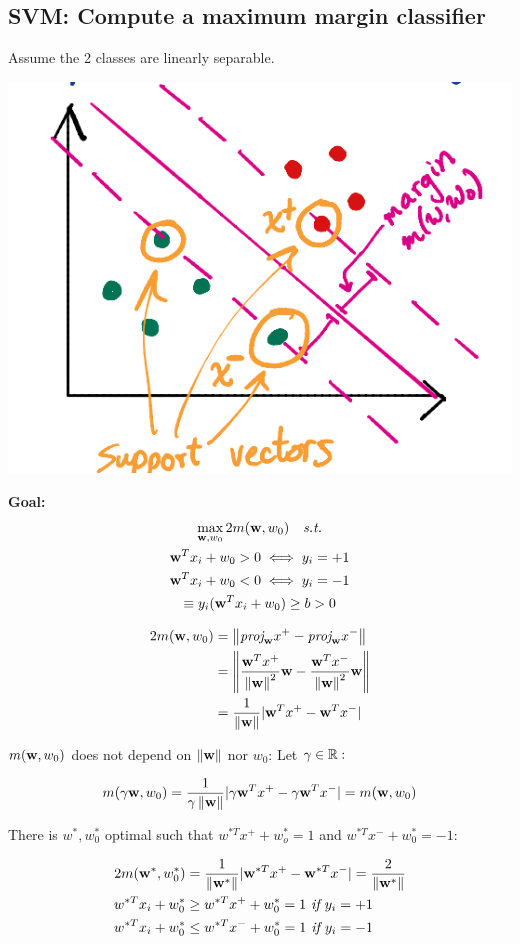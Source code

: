 \subsection{SVM: Compute a maximum margin classifier}
Assume the 2 classes are linearly separable.
\begin{center}
	\includegraphics[width=0.6\columnwidth]{images/7-SVM-max-margin}
\end{center}

\textbf{Goal: }
\begin{equation*}
	\begin{gathered}
		\max_{\mathbf w, w_0} 2m(\mathbf w,w_0) \quad\textit{s.t.} \\
		\mathbf w^Tx_i + w_0 > 0 \iff y_i = +1 \\
		\mathbf w^Tx_i + w_0 < 0 \iff y_i = -1 \\
		\equiv y_i(\mathbf w^Tx_i + w_0) \geq b > 0
	\end{gathered}
\end{equation*}

\begin{align*}
	2m(\mathbf w, w_0) &= \left\lVert\textit{proj}_\mathbf w x^+ - \textit{proj}_\mathbf w x^-\right\rVert \\
				&= \left\lVert\frac{\mathbf w^T x^+}{\left\lVert\mathbf w\right\rVert^2} \mathbf w -\frac{\mathbf w^T x^-}{\left\lVert\mathbf w\right\rVert^2} \mathbf w\right\rVert \\
				&= \frac{1}{\left\lVert\mathbf w\right\rVert} |\mathbf w^T x^+ - \mathbf w^T x^-|
\end{align*}

$m(\mathbf w, w_0)$ does not depend on $\left\lVert\mathbf w\right\rVert$ nor $w_0$: Let $\gamma \in \mathbb R: $

$$
	m(\gamma \mathbf w, w_0) = \frac{1}{\gamma\left\lVert\mathbf w\right\rVert} |\gamma\mathbf w^Tx^+ - \gamma\mathbf w^Tx^-| = m(\mathbf w, w_0)
$$

There is $w^*, w_0^*$ optimal such that $w^{*T}x^+ + w_o^* = 1$ and $w^{*T}x^- + w_0^* = -1$:

\begin{align*}
	2m(\mathbf w^*, w_0^*) &= \frac{1}{\left\lVert\mathbf w^*\right\rVert} |\mathbf w^{*T}x^+ - \mathbf w^{*T} x^-| = \frac{2}{\left\lVert\mathbf w^*\right\rVert}\\
	w^{*T}x_i + w_0^* &\geq w^{*T}x^+ + w_0^* = 1 \textit{ if } y_i = +1 \\
	w^{*T}x_i + w_0^* &\leq w^{*T}x^- + w_0^* = 1 \textit{ if } y_i = -1 \\
\end{align*}

